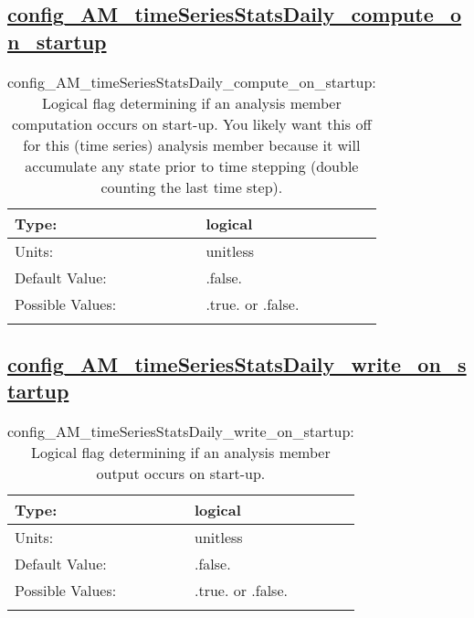 \subsection[config\_AM\_timeSeriesStatsDaily\_compute\_on\_startup]{\hyperref[sec:nm_tab_AM_timeSeriesStatsDaily]{config\_AM\_timeSeriesStatsDaily\_compute\_on\_startup}}
\label{subsec:nm_sec_config_AM_timeSeriesStatsDaily_compute_on_startup}
\begin{center}
\begin{longtable}{| p{2.0in} || p{4.0in} |}
    \hline
    Type: & logical \\
    \hline
    Units: & \si{unitless} \\
    \hline
    Default Value: & .false. \\
    \hline
    Possible Values: & .true. or .false. \\
    \hline
    \caption{config\_AM\_timeSeriesStatsDaily\_compute\_on\_startup: Logical flag determining if an analysis member computation occurs on start-up. You likely want this off for this (time series) analysis member because it will accumulate any state prior to time stepping (double counting the last time step).}
\end{longtable}
\end{center}
\subsection[config\_AM\_timeSeriesStatsDaily\_write\_on\_startup]{\hyperref[sec:nm_tab_AM_timeSeriesStatsDaily]{config\_AM\_timeSeriesStatsDaily\_write\_on\_startup}}
\label{subsec:nm_sec_config_AM_timeSeriesStatsDaily_write_on_startup}
\begin{center}
\begin{longtable}{| p{2.0in} || p{4.0in} |}
    \hline
    Type: & logical \\
    \hline
    Units: & \si{unitless} \\
    \hline
    Default Value: & .false. \\
    \hline
    Possible Values: & .true. or .false. \\
    \hline
    \caption{config\_AM\_timeSeriesStatsDaily\_write\_on\_startup: Logical flag determining if an analysis member output occurs on start-up.}
\end{longtable}
\end{center}
